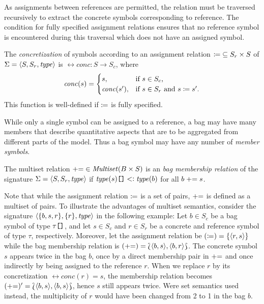 As assignments between references are permitted, the relation  must be traversed recursively to extract the concrete symbols corresponding to reference. The condition for fully specified assignment relations ensures that no reference symbol is encountered during this traversal which does not have an assigned symbol. 
\begin{dfn}
  The \emph{concretization} of symbols according to an  assignment relation \({\coloneq} \subseteq S_r \times S\) of \(\Sigma = \langle S, S_r, \textrm{\itshape type\/} \rangle\) is \(\rel{conc}\colon S \to S_c\), where
  \begin{equation}
    \textrm{\itshape conc\/}(s) = \begin{cases}
      s, & \text{if \(s \in S_c\),} \\
      \textrm{\itshape conc\/}(s'), & \text{if \(s \in S_r\) and \(s \coloneq s'\).}
    \end{cases}
  \end{equation}
  This function is well-defined if \(\coloneq\) is fully specified.
\end{dfn}

While only a single symbol can be assigned to a reference, a bag may have many members that describe quantitative aspects that are to be aggregated from different parts of the model. Thus a bag symbol may have any number of \emph{member symbols}.
\begin{dfn}
  The multiset relation \({\mathrel{{+}{=}}} \in \textrm{\itshape Multiset\/}(B \times S)\) is an \emph{ bag membership relation} of the signature \(\Sigma = \langle S, S_r, \textrm{\itshape type\/} \rangle\) if \(\textrm{\itshape type\/}(s)\mathclose{\texttt{[]}} \mathrel{<\vcentcolon} \textrm{\itshape type\/}(b)\) for all \(b \mathrel{{+}{=}} s\).
\end{dfn}

Note that while the assignment relation \(\coloneq\) is a set of pairs, \(\mathrel{{+}{=}}\) is defined as a multiset of pairs. To illustrate the advantages of multiset semantics, consider the signature \(\langle \{b, s, r\}, \{r\}, \textrm{\itshape type\/} \rangle\) in the following example: Let \(b \in S_c\) be a bag symbol of type \(\tau\mathclose{\texttt{[]}}\), and let \(s \in S_c\) and \(r \in S_r\) be a concrete and reference symbol of type $\tau$, respectively. Moreover, let the assignment relation be \((\coloneq) = \{\langle r, s\rangle\}\) while the bag membership relation is \((\mathrel{{+}{=}}) = \Lbag \langle b, s\rangle, \langle b, r\rangle\Rbag\). The concrete symbol \(s\) appears twice in the bag \(b\), once by a direct membership pair in \(\mathrel{{+}{=}}\) and once indirectly by being assigned to the reference \(r\). When we replace \(r\) by its concretization \(\rel{conc}(r) = s\), the membership relation becomes \((\mathrel{{+}{=}})' = \Lbag \langle b, s\rangle, \langle b, s\rangle\Rbag\), hence \(s\) still appears twice. Were set semantics used instead, the multiplicity of \(r\) would have been changed from 2 to 1 in the bag \(b\).

